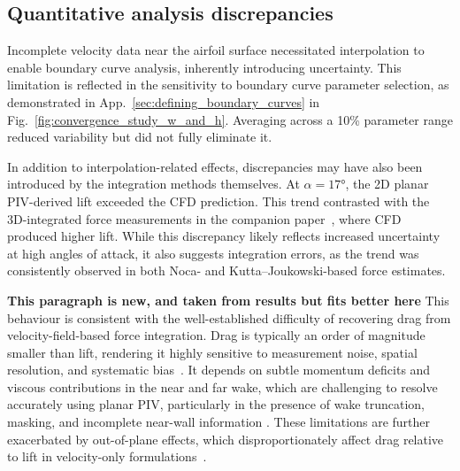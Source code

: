 \documentclass[wes, manuscript]{copernicus}
\begin{document}
\subsection{Quantitative analysis discrepancies}
%
Incomplete velocity data near the airfoil surface necessitated interpolation to enable boundary curve analysis, inherently introducing uncertainty. This limitation is reflected in the sensitivity to boundary curve parameter selection, as demonstrated in App.~\ref{sec:defining_boundary_curves} in Fig.~\ref{fig:convergence_study_w_and_h}. Averaging across a 10\% parameter range reduced variability but did not fully eliminate it. 

In addition to interpolation-related effects, discrepancies may have also been introduced by the integration methods themselves. 
At $\alpha = 17\unit{\degree}$, the 2D planar PIV-derived lift exceeded the CFD prediction. This trend contrasted with the 3D-integrated force measurements in the companion paper~\citep{Poland2026a}, where CFD produced higher lift.
While this discrepancy likely reflects increased uncertainty at high angles of attack, it also suggests integration errors, as the trend was consistently observed in both Noca- and Kutta–Joukowski-based force estimates.

\textbf{This paragraph is new, and taken from results but fits better here}
This behaviour is consistent with the well-established difficulty of 
recovering drag from velocity-field-based force integration. Drag is 
typically an order of magnitude smaller than lift, rendering it highly 
sensitive to measurement noise, spatial resolution, and systematic 
bias~\citep{Fritz2024a,Fritz2024b}. It depends on subtle momentum deficits 
and viscous contributions in the near and far wake, which are challenging 
to resolve accurately using planar PIV, particularly in the presence of 
wake truncation, masking, and incomplete near-wall information 
\citep{Huang2023}. These limitations are further exacerbated by 
out-of-plane effects, which disproportionately affect drag relative to 
lift in velocity-only formulations~\citep{LeBlanc2022}.
\end{document}
